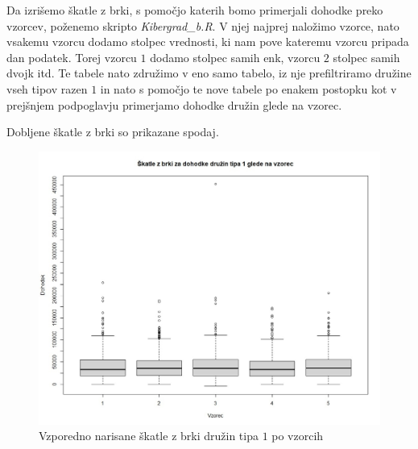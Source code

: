 \documentclass[a4paper, 10pt]{article}
\begin{document}
	Da izrišemo škatle z brki, s pomočjo katerih bomo primerjali dohodke preko vzorcev, poženemo skripto \textit{Kibergrad\_b.R}. V njej najprej naložimo vzorce, nato vsakemu vzorcu dodamo stolpec vrednosti, ki nam pove kateremu vzorcu pripada dan podatek. Torej vzorcu $1$ dodamo stolpec samih enk, vzorcu $2$ stolpec samih dvojk itd. Te tabele nato združimo v eno samo tabelo, iz nje prefiltriramo družine vseh tipov razen $1$ in nato s pomočjo te nove tabele po enakem postopku kot v prejšnjem podpoglavju primerjamo dohodke družin glede na vzorec.

	Dobljene škatle z brki so prikazane spodaj.

	\begin{figure}[h!]
		\centering
		\includegraphics[scale = 0.425]{SkatlezbrkiB}
		\caption{Vzporedno narisane škatle z brki družin tipa $1$ po vzorcih}
	\end{figure}
\end{document}
